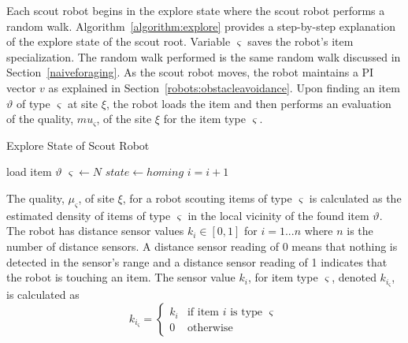 Each scout robot begins in the explore state where the scout robot performs a random walk. Algorithm~\ref{algorithm:explore} provides a step-by-step explanation of the explore state of the scout root. Variable $\varsigma$ saves the robot's item specialization. The random walk performed is the same random walk discussed in Section~\ref{naiveforaging}. As the scout robot moves, the robot maintains a PI vector $v$ as explained in Section~\ref{robots:obstacleavoidance}. Upon finding an item $\vartheta$ of type $\varsigma$ at site $\xi$, the robot loads the item and then performs an evaluation of the quality, $mu_\varsigma$, of the site $\xi$ for the item type $\varsigma$. 


\begin{algorithm}
\caption{Explore State of Scout Robot}
\label{algorithm:explore}
\begin{algorithmic}[1]
\State {}
\State {}

 	\State {}
	\State load item $\vartheta$
	\State $\varsigma \gets N$
	\State $state \gets homing$
\EndIf
\State $i =i + 1$
\EndFunction
\end{algorithmic}
\end{algorithm}

The quality, $\mu_\varsigma$, of site $\xi$, for a robot scouting items of type $\varsigma$ is calculated as the estimated density of items of type $\varsigma$ in the local vicinity of the found item $\vartheta$. The robot has distance sensor values $k_i\in[0,1]$ for $ i = 1...n$ where $n$ is the number of distance sensors. A distance sensor reading of 0 means that nothing is detected in the sensor's range and a distance sensor reading of 1 indicates that the robot is touching an item. The sensor value $k_i$, for item type $\varsigma$, denoted $k_{i_\varsigma}$, is calculated as 
\begin{equation}
\label{densitytype}
k_{i_\varsigma}=
    \begin{cases}
      k_i & \text{if item $i$ is type $\varsigma$} \\
      0 & \text{otherwise}
    \end{cases}
\end{equation}

